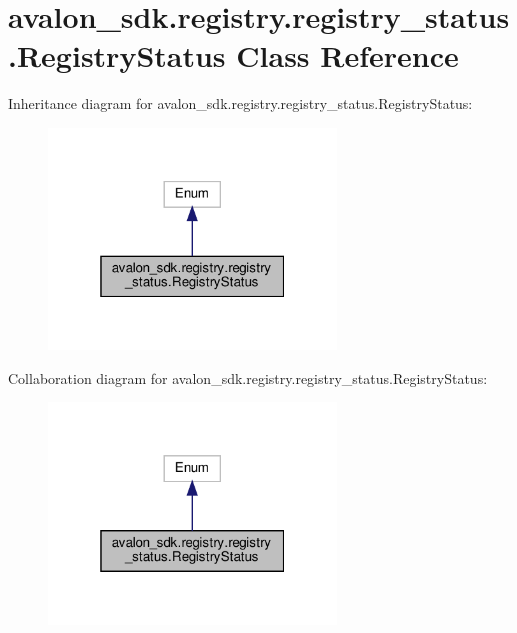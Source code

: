 \hypertarget{classavalon__sdk_1_1registry_1_1registry__status_1_1RegistryStatus}{}\section{avalon\+\_\+sdk.\+registry.\+registry\+\_\+status.\+Registry\+Status Class Reference}
\label{classavalon__sdk_1_1registry_1_1registry__status_1_1RegistryStatus}


Inheritance diagram for avalon\+\_\+sdk.\+registry.\+registry\+\_\+status.\+Registry\+Status\+:
\nopagebreak
\begin{figure}[H]
\begin{center}
\leavevmode
\includegraphics[width=217pt]{classavalon__sdk_1_1registry_1_1registry__status_1_1RegistryStatus__inherit__graph}
\end{center}
\end{figure}


Collaboration diagram for avalon\+\_\+sdk.\+registry.\+registry\+\_\+status.\+Registry\+Status\+:
\nopagebreak
\begin{figure}[H]
\begin{center}
\leavevmode
\includegraphics[width=217pt]{classavalon__sdk_1_1registry_1_1registry__status_1_1RegistryStatus__coll__graph}
\end{center}
\end{figure}

